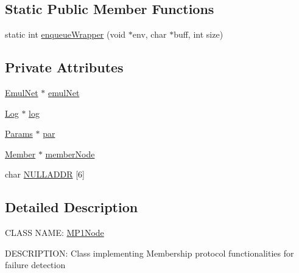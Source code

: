 \subsection*{\-Static \-Public \-Member \-Functions}
\begin{DoxyCompactItemize}
\item 
static int \hyperlink{class_m_p1_node_af45c64abc521a0674234ec4a0621b4e1}{enqueue\-Wrapper} (void $\ast$env, char $\ast$buff, int size)
\end{DoxyCompactItemize}
\subsection*{\-Private \-Attributes}
\begin{DoxyCompactItemize}
\item 
\hyperlink{class_emul_net}{\-Emul\-Net} $\ast$ \hyperlink{class_m_p1_node_a449d3fc835bd980a1fd9af2072f05b0e}{emul\-Net}
\item 
\hyperlink{class_log}{\-Log} $\ast$ \hyperlink{class_m_p1_node_aaba40df80a4669363245ac74c3ff19f5}{log}
\item 
\hyperlink{class_params}{\-Params} $\ast$ \hyperlink{class_m_p1_node_ae2fee312946f5db771601f0c1b05f50d}{par}
\item 
\hyperlink{class_member}{\-Member} $\ast$ \hyperlink{class_m_p1_node_a328d012a8827407b51ea765ee420b8a3}{member\-Node}
\item 
char \hyperlink{class_m_p1_node_a796defbef0578537c785a1c806127bb4}{\-N\-U\-L\-L\-A\-D\-D\-R} \mbox{[}6\mbox{]}
\end{DoxyCompactItemize}


\subsection{\-Detailed \-Description}
\-C\-L\-A\-S\-S \-N\-A\-M\-E\-: \hyperlink{class_m_p1_node}{\-M\-P1\-Node}

\-D\-E\-S\-C\-R\-I\-P\-T\-I\-O\-N\-: \-Class implementing \-Membership protocol functionalities for failure detection 

